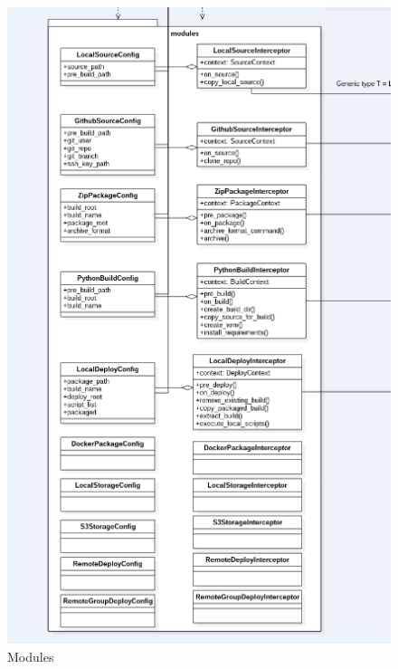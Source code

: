 	\begin{figure}[H]
		\includegraphics[width = 1.2\linewidth]{diagrams/modules.png}
		\caption{Modules}
	\end{figure}

